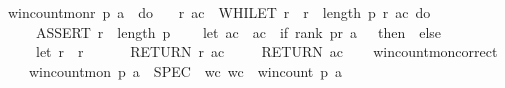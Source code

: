 \begin{isabellebody}
{\isachardoublequoteopen}win{\isacharunderscore}{\kern0pt}count{\isacharunderscore}{\kern0pt}mon{\isacharunderscore}{\kern0pt}r\ p\ a\ {\isasymequiv}\ do\ {\isacharbraceleft}{\kern0pt}\isanewline
\ \ {\isacharparenleft}{\kern0pt}r{\isacharcomma}{\kern0pt}\ ac{\isacharparenright}{\kern0pt}\ {\isasymleftarrow}\ WHILET\ {\isacharparenleft}{\kern0pt}{\isasymlambda}{\isacharparenleft}{\kern0pt}r{\isacharcomma}{\kern0pt}\ {\isacharunderscore}{\kern0pt}{\isacharparenright}{\kern0pt}{\isachardot}{\kern0pt}\ r\ {\isacharless}{\kern0pt}\ length\ p{\isacharparenright}{\kern0pt}\ {\isacharparenleft}{\kern0pt}{\isasymlambda}{\isacharparenleft}{\kern0pt}r{\isacharcomma}{\kern0pt}\ ac{\isacharparenright}{\kern0pt}{\isachardot}{\kern0pt}\ do\ {\isacharbraceleft}{\kern0pt}\isanewline
\ \ \ \ ASSERT\ {\isacharparenleft}{\kern0pt}r\ {\isacharless}{\kern0pt}\ length\ p{\isacharparenright}{\kern0pt}{\isacharsemicolon}{\kern0pt}\isanewline
\ \ \ \ let\ ac\ {\isacharequal}{\kern0pt}\ ac\ {\isacharplus}{\kern0pt}\ {\isacharparenleft}{\kern0pt}if\ {\isacharparenleft}{\kern0pt}rank\ {\isacharparenleft}{\kern0pt}p{\isacharbang}{\kern0pt}r{\isacharparenright}{\kern0pt}\ a\ {\isacharequal}{\kern0pt}\ {}{\isacharparenright}{\kern0pt}\ then\ {}\ else\ {}{\isacharparenright}{\kern0pt}{\isacharsemicolon}{\kern0pt}\isanewline
\ \ \ \ let\ r\ {\isacharequal}{\kern0pt}\ r\ {\isacharplus}{\kern0pt}\ {}{\isacharsemicolon}{\kern0pt}\isanewline
\ \ \ \ RETURN\ {\isacharparenleft}{\kern0pt}r{\isacharcomma}{\kern0pt}\ ac{\isacharparenright}{\kern0pt}\isanewline
\ \ {\isacharbraceright}{\kern0pt}{\isacharparenright}{\kern0pt}{\isacharparenleft}{\kern0pt}{}{\isacharcomma}{\kern0pt}{}{\isacharparenright}{\kern0pt}{\isacharsemicolon}{\kern0pt}\isanewline
\ \ RETURN\ ac\isanewline
{\isacharbraceright}{\kern0pt}{\isachardoublequoteclose}\isanewline
\ \ \isanewline
\isanewline
\isanewline
\isanewline
\isanewline
{}\isamarkupfalse%
\ win{\isacharunderscore}{\kern0pt}count{\isacharunderscore}{\kern0pt}mon{\isacharunderscore}{\kern0pt}correct{\isacharcolon}{\kern0pt}\isanewline
\ \ \ {\isachardoublequoteopen}win{\isacharunderscore}{\kern0pt}count{\isacharunderscore}{\kern0pt}mon\ p\ a\ {\isasymle}\ SPEC\ {\isacharparenleft}{\kern0pt}{\isasymlambda}\ wc{\isachardot}{\kern0pt}\ wc\ {\isacharequal}{\kern0pt}\ win{\isacharunderscore}{\kern0pt}count\ p\ a{\isacharparenright}{\kern0pt}{\isachardoublequoteclose}\isanewline
%
\isadelimproof
\ \ %
\endisadelimproof
%
\isatagproof
{}\isamarkupfalse%

\end{isabellebody}
